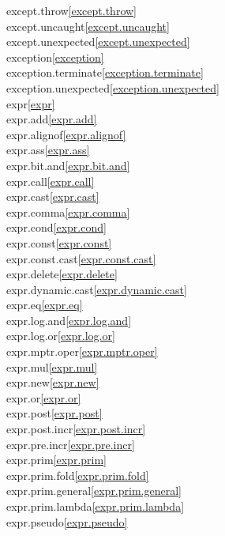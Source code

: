 \begin{multicols}{2}
except.throw\quad\ref{except.throw}\\
except.uncaught\quad\ref{except.uncaught}\\
except.unexpected\quad\ref{except.unexpected}\\
exception\quad\ref{exception}\\
exception.terminate\quad\ref{exception.terminate}\\
exception.unexpected\quad\ref{exception.unexpected}\\
expr\quad\ref{expr}\\
expr.add\quad\ref{expr.add}\\
expr.alignof\quad\ref{expr.alignof}\\
expr.ass\quad\ref{expr.ass}\\
expr.bit.and\quad\ref{expr.bit.and}\\
expr.call\quad\ref{expr.call}\\
expr.cast\quad\ref{expr.cast}\\
expr.comma\quad\ref{expr.comma}\\
expr.cond\quad\ref{expr.cond}\\
expr.const\quad\ref{expr.const}\\
expr.const.cast\quad\ref{expr.const.cast}\\
expr.delete\quad\ref{expr.delete}\\
expr.dynamic.cast\quad\ref{expr.dynamic.cast}\\
expr.eq\quad\ref{expr.eq}\\
expr.log.and\quad\ref{expr.log.and}\\
expr.log.or\quad\ref{expr.log.or}\\
expr.mptr.oper\quad\ref{expr.mptr.oper}\\
expr.mul\quad\ref{expr.mul}\\
expr.new\quad\ref{expr.new}\\
expr.or\quad\ref{expr.or}\\
expr.post\quad\ref{expr.post}\\
expr.post.incr\quad\ref{expr.post.incr}\\
expr.pre.incr\quad\ref{expr.pre.incr}\\
expr.prim\quad\ref{expr.prim}\\
expr.prim.fold\quad\ref{expr.prim.fold}\\
expr.prim.general\quad\ref{expr.prim.general}\\
expr.prim.lambda\quad\ref{expr.prim.lambda}\\
expr.pseudo\quad\ref{expr.pseudo}\\

\end{multicols}
